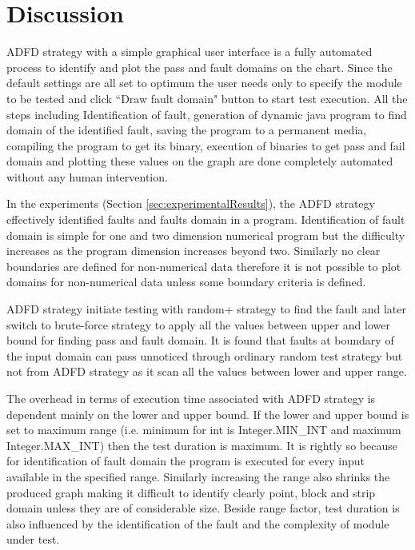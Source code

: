 



\section{Discussion} \label{sec:discussion4}

ADFD strategy with a simple graphical user interface is a fully automated process to identify and plot the pass and fault domains on the chart. Since the default settings are all set to optimum the user needs only to specify the module to be tested and click ``Draw fault domain" button to start test execution. All the steps including Identification of fault, generation of dynamic java program to find domain of the identified fault, saving the program to a permanent media, compiling the program to get its binary, execution of binaries to get pass and fail domain and plotting these values on the graph are done completely automated without any human intervention.

In the experiments (Section \ref{sec:experimentalResults}), the ADFD strategy effectively identified faults and faults domain in a program. Identification of fault domain is simple for one and two dimension numerical program but the difficulty increases as the program dimension increases beyond two. Similarly no clear boundaries are defined for non-numerical data therefore it is not possible to plot domains for non-numerical data unless some boundary criteria is defined.

ADFD strategy initiate testing with random+ strategy to find the fault and later switch to brute-force strategy to apply all the values between upper and lower bound for finding pass and fault domain. 
It is found that faults at boundary of the input domain can pass unnoticed through ordinary random test strategy but not from ADFD strategy as it scan all the values between lower and upper range.


The overhead in terms of execution time associated with ADFD strategy is dependent mainly on the lower and upper bound. If the lower and upper bound is set to maximum range (i.e. minimum for int is Integer.MIN\_INT and maximum Integer.MAX\_INT) then the test duration is maximum. It is rightly so because for identification of fault domain the program is executed for every input available in the specified range. Similarly increasing the range also shrinks the produced graph making it difficult to identify clearly point, block and strip domain unless they are of considerable size. Beside range factor, test duration is also influenced by the identification of the fault and the complexity of module under test.

